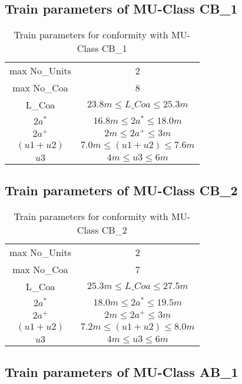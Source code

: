 \begin{appendices}
\subsection{Train parameters of MU-Class CB\_1}

\begin{table}[h]
    \centering
    \begin{tabular}{c|c}
    \hline
    max No\_Units & 2 \\
    max No\_Coa & 8 \\
    L\_Coa & $23.8m \leq L\_Coa \leq 25.3m $ \\
    $2a^*$ & $16.8m \leq 2a^* \leq 18.0m $ \\
    $2a^+$ & $2m \leq 2a^+ \leq 3m $ \\
    $(u1+u2)$ & $7.0m \leq (u1+u2) \leq 7.6m $ \\
    $u3$ & $4m \leq u3 \leq 6m $ \\
    \hline
    \end{tabular}
    \caption{Train parameters for conformity with MU-Class CB\_1}
    \label{tab:CB1}
\end{table}

\subsection{Train parameters of MU-Class CB\_2}

\begin{table}[h]
    \centering
    \begin{tabular}{c|c}
    \hline
    max No\_Units & 2 \\
    max No\_Coa & 7 \\
    L\_Coa & $ 25.3 m \leq L\_Coa \leq 27.5 m $ \\
    $2a^*$ & $ 18.0 m \leq 2a^* \leq 19.5 m $ \\
    $2a^+$ & $ 2 m \leq 2a^+ \leq 3m $ \\
    $(u1+u2)$ & $7.2m \leq (u1+u2) \leq 8.0 m $ \\
    $u3$ & $4m \leq u3 \leq 6m $ \\
    \hline
    \end{tabular}
    \caption{Train parameters for conformity with MU-Class CB\_2}
    \label{tab:CB2}
\end{table}


\subsection{Train parameters of MU-Class AB\_1}


\end{appendices}
